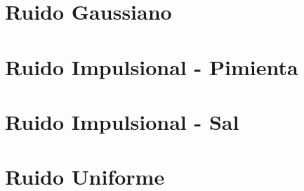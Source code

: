 \documentclass[
  letterpaper,
  twocolumn,
  9pt,
  journal,
  final]{IEEEtran}
\begin{document}
\section{Ruido Gaussiano}

\section{Ruido Impulsional - Pimienta}

\section{Ruido Impulsional - Sal}

\section{Ruido Uniforme}


\nocite{*}


\end{document}
